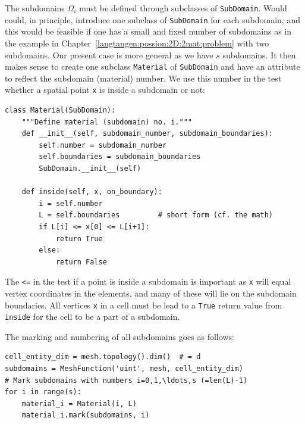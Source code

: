 The subdomains $\Omega_i$ must be defined through subclasses
of {\fontsize{12pt}{12pt}\texttt{SubDomain}}. Would could, in principle,
introduce one subclass of {\fontsize{12pt}{12pt}\texttt{SubDomain}} for each subdomain, and
this would be feasible if one has a small and fixed number of
subdomains as in the example in Chapter~\ref{langtangen:possion:2D:2mat:problem} with
two subdomains. Our present case is more general as we
have $s$ subdomains. It then makes sense to create one
subclass {\fontsize{12pt}{12pt}\texttt{Material}} of {\fontsize{12pt}{12pt}\texttt{SubDomain}} and have an attribute
to reflect the subdomain (material) number. We use this number
in the test whether a spatial point {\fontsize{12pt}{12pt}\texttt{x}} is inside a subdomain or not:
\begin{Verbatim}[fontsize=\fontsize{10pt}{10pt},tabsize=8,baselinestretch=1.05,
fontfamily=tt,xleftmargin=7mm]
class Material(SubDomain):
    """Define material (subdomain) no. i."""
    def __init__(self, subdomain_number, subdomain_boundaries):
        self.number = subdomain_number
        self.boundaries = subdomain_boundaries
        SubDomain.__init__(self)

    def inside(self, x, on_boundary):
        i = self.number
        L = self.boundaries         # short form (cf. the math)
        if L[i] <= x[0] <= L[i+1]:
            return True
        else:
            return False
\end{Verbatim}
\noindent
The {\fontsize{12pt}{12pt}\texttt{<=}} in the test if a point is inside a subdomain is important as
{\fontsize{12pt}{12pt}\texttt{x}} will equal vertex coordinates in the elements, and many of these
will lie
on the subdomain boundaries. All vertices {\fontsize{12pt}{12pt}\texttt{x}}
in a cell must be lead to a {\fontsize{12pt}{12pt}\texttt{True}} return value from {\fontsize{12pt}{12pt}\texttt{inside}}
for the cell to be a part of a subdomain.

The marking and numbering of all subdomains
goes as follows:
\begin{Verbatim}[fontsize=\fontsize{10pt}{10pt},tabsize=8,baselinestretch=1.05,
fontfamily=tt,xleftmargin=7mm]
cell_entity_dim = mesh.topology().dim()  # = d
subdomains = MeshFunction('uint', mesh, cell_entity_dim)
# Mark subdomains with numbers i=0,1,\ldots,s (=len(L)-1)
for i in range(s):
    material_i = Material(i, L)
    material_i.mark(subdomains, i)
\end{Verbatim}
\noindent

